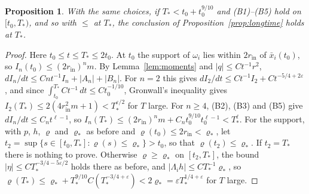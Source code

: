\documentclass[11pt]{article}
\newtheorem{proposition}{Proposition}
\theoremstyle{definition}
\begin{document}
\begin{proposition}\label{prop:shorttime}
With the same choices, if $T_* < t_0 + t_0^{9/10}$ and (B1)--(B5) hold on $[t_0, T_*)$, and so with $\le$ at $T_*$, the conclusion of Proposition~\ref{prop:longtime} holds at $T_*$.
\end{proposition}

\begin{proof}
Here $t_0 \le t \le T_* \le 2t_0$. At $t_0$ the support of $\omega_i$ lies within $2r_{\mathrm{in}}$ of $\bar x_i(t_0)$, so $I_n(t_0) \le (2r_{\mathrm{in}})^nm$. By Lemma~\ref{lem:moments} and $|q| \le Ct^{-1}r^2$, $dI_n/dt \le Cnt^{-1}I_n + |A_n| + |B_n|$. For $n = 2$ this gives $dI_2/dt \le Ct^{-1}I_2 + Ct^{-5/4+2\varepsilon}$, and since $\int_{t_0}^{T_*}Ct^{-1}\,dt \le Ct_0^{-1/10}$, Gronwall's inequality gives $I_2(T_*) \le 2(4r_{\mathrm{in}}^2m + 1) < T_*^{\varepsilon/2}$ for $T$ large. For $n \ge 4$, (B2), (B3) and (B5) give $dI_n/dt \le C_nt^{\ell-1}$, so $I_n(T_*) \le (2r_{\mathrm{in}})^nm + C_nt_0^{9/10}t_0^{\ell-1} < T_*^\ell$. For the support, with $p$, $h$, $\varrho$ and $\varrho_*$ as before and $\varrho(t_0) \le 2r_{\mathrm{in}} < \varrho_*$, let $t_2 = \sup\{s \in [t_0, T_*] : \varrho(s) \le \varrho_*\} > t_0$, so that $\varrho(t_2) \le \varrho_*$. If $t_2 = T_*$ there is nothing to prove. Otherwise $\varrho \ge \varrho_*$ on $[t_2, T_*]$, the bound $|\eta| \le CT_*^{-3/4-5\varepsilon/2}$ holds there as before, and $|\Lambda_ih| \le CT_*^{-1}\varrho_*$, so $\varrho(T_*) \le \varrho_* + T_*^{9/10}C(T_*^{-3/4+\varepsilon}) < 2\varrho_* = \varepsilon T_*^{1/4+\varepsilon}$ for $T$ large.
\end{proof}
\end{document}
